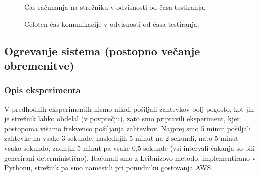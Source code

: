 \begin{figure}[H]
    \caption{Čas računanja na strežniku v odvisnosti od časa testiranja.}
    \label{fig:3_rezultati3_T2}
\end{figure}

\begin{figure}[H]
    \caption{Celoten čas komunikacije v odvisnosti od časa testiranja.}
    \label{fig:3_rezultati3_T1T3}
\end{figure}



\subsection{Ogrevanje sistema (postopno večanje obremenitve)}

\subsubsection{Opis eksperimenta}

V predhodnih eksperimentih nismo nikoli pošiljali zahtevkov bolj pogosto, kot jih je strežnik lahko obdelal (v povprečju), zato smo pripravili eksperiment, kjer postopoma višamo frekvenco pošiljanja zahtevkov.
Najprej smo 5 minut pošiljali zahtevke na vsake 3 sekunde, naslednjih 5 minut na 2 sekundi, nato 5 minut vsako sekundo, zadnjih 5 minut pa vsake 0,5 sekunde (vsi intervali čakanja so bili generirani deterministično).
Računali smo z Leibnizovo metodo, implementirano v Pythonu, strežnik pa smo namestili pri ponudniku gostovanja AWS.

